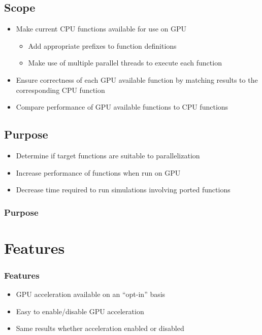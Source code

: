 \documentclass{beamer}
\begin{document}
\subsection{Scope}
\begin{frame}
\begin{itemize}
\frametitle{Scope}
\item Make current CPU functions available for use on GPU
\begin{itemize}
\item Add appropriate prefixes to function definitions
\item Make use of multiple parallel threads to execute each function
\end{itemize}
\item Ensure correctness of each GPU available function by matching results to the corresponding CPU function
\item Compare performance of GPU available functions to CPU functions
\end{itemize}
\end{frame}

\subsection{Purpose}
\begin{frame}
\begin{itemize}
\item Determine if target functions are suitable to parallelization 
\item Increase performance of functions when run on GPU
\item Decrease time required to run simulations involving ported functions
\end{itemize}
\frametitle{Purpose}
\end{frame}


\section{Features}
\begin{frame}
\frametitle{Features}
\begin{itemize}
\item GPU acceleration available on an ``opt-in'' basis
\item Easy to enable/disable GPU acceleration
\item Same results whether acceleration enabled or disabled
\end{itemize}
\end{frame}
\end{document}
